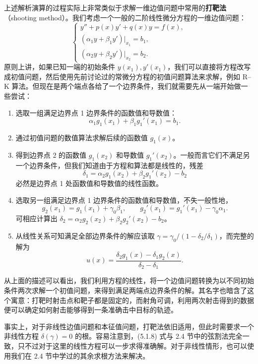 上述解析演算的过程实际上非常类似于求解一维边值问题中常用的\textbf{打靶法}（shooting method）。我们考虑一个一般的二阶线性微分方程的一维边值问题：
\begin{equation}
\begin{cases}
y''+p(x)y'+q(x)y=f(x),\\
(\alpha_1y+\beta_1y')|_{x_1}=b_1,\\
(\alpha_2y+\beta_2y')|_{x_2}=b_2.
\end{cases}
\tag{5.1.7}
\end{equation}
原则上讲，如果已知一端的初始条件 $y(x_1),y'(x_1)$，我们可以直接将方程改写成初值问题，然后使用先前讨论过的常微分方程的初值问题算法来求解，例如 R--K 算法。但现在是两个端点各给了一个边界条件，我们就需要先从一端开始做一些尝试：
\begin{enumerate}[label=(\arabic*)]
\item 选取一组满足边界点 1 边界条件的函数值和导数值：
\[
\alpha_1g_1(x_1)+\beta_1g_1'(x_1)=b_1.
\]
\item 通过初值问题的数值算法求解后续的函数值 $g_1(x)$。
\item 得到边界点 2 的函数值 $g_1(x_2)$ 和导数值 $g_1'(x_2)$。一般而言它们不满足另一个边界条件，但我们知道由于方程和算法都是线性的，残差
\[
\delta_1=\alpha_2g_1(x_2)+\beta_2g_1'(x_2)-b_2
\]
必然是边界点 1 处函数值和导数值的线性函数。
\item 选取另一组满足边界点 1 边界条件的函数值和导数值，不失一般性地，
\[
 g_2(x_1)=g_1(x_1)+\gamma_0\beta_1,\qquad
 g_2'(x_1)=g_1'(x_1)-\gamma_0\alpha_1.
\]
可相应计算出 $\delta_2=\alpha_2g_2(x_2)+\beta_2g_2'(x_2)-b_2$。
\item 从线性关系可知满足全部边界条件的解应该取 $\gamma=\gamma_0/(1-\delta_2/\delta_1)$，而完整的解为
\begin{equation}
u(x)=\frac{\delta_2g_1(x)-\delta_1g_2(x)}{\delta_2-\delta_1}.
\tag{5.1.8}
\end{equation}
\end{enumerate}
从上面的描述可以看出，我们利用方程的线性，将一个边值问题转换为以不同初始条件两次求解一个初值问题，来得到满足两端点边界条件的解。其名字也暗含了这个寓意：打靶时射击点和靶子都是固定的，而射角可调，利用两次射击得到的数据便可以确定如何射击能够得到一条准确击中目标的轨迹。

事实上，对于非线性边值问题和本征值问题，打靶法依旧适用，但此时需要求一个非线性方程 $\delta(\gamma)=0$ 的根。容易注意到，(5.1.8) 式与 2.4 节中的弦割法完全一致，只不过对于这里的线性方程可以一步求得准确解。对于非线性情形，也可以使用我们在 2.4 节中学过的其余求根方法来解决。

